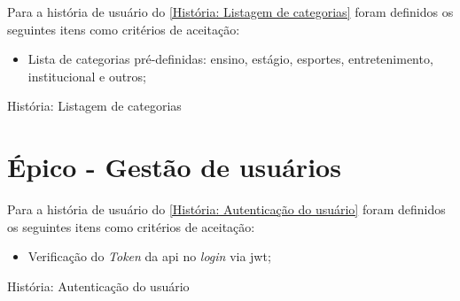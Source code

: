 Para a história de usuário do \autoref{História: Listagem de categorias} foram definidos os seguintes itens como critérios de aceitação:

\begin{itemize}
\item Lista de categorias pré-definidas: ensino, estágio, esportes, entretenimento, institucional e outros;  
\end{itemize}

\def\arraystretch{2}
\begin{quadro}[htb]
\centering
\ABNTEXfontereduzida
\caption[História: Listagem de categorias]{História: Listagem de categorias}
\label{História: Listagem de categorias}
\end{quadro}
\FloatBarrier 

\section{Épico - Gestão de usuários}
\label{gestão_usuario}
Para a história de usuário do \autoref{História: Autenticação do usuário} foram definidos os seguintes itens como critérios de aceitação:

\begin{itemize}
\item Verificação do \textsl{Token} da \acs{api} no \textsl{login} via \acs{jwt};
\end{itemize}

\def\arraystretch{2}
\begin{quadro}[htb]
\centering
\ABNTEXfontereduzida
\caption[História: Autenticação do usuário]{História: Autenticação do usuário}
\label{História: Autenticação do usuário}
\end{quadro}
\FloatBarrier 

